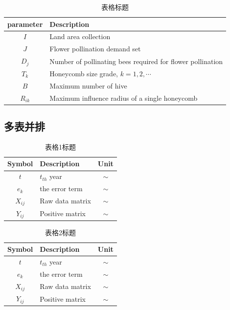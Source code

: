 \documentclass{resume/dhuBachelorclass}
\begin{document}
\begin{table}[H]
    \centering
    \caption{表格标题}
        \begin{tabular}{c||l}
        \toprule
        parameter  & Description \\
        \midrule
        $I$ & Land area collection \\
        $J$ & Flower pollination demand set \\
        $D_j$ & Number of pollinating bees required for flower pollination \\
        $T_k$ & Honeycomb size grade, $k = 1, 2, \cdots$ \\
        $B$ & Maximum number of hive \\
        $R_{ik}$ & Maximum influence radius of a single honeycomb \\
        \bottomrule
        \end{tabular}%
    \label{tab: 一个表}%
\end{table}%

\subsection{多表并排}

\begin{minipage}[c]{0.45\textwidth}
    \centering
    \begin{table}[H]
        \centering
        \caption{表格1标题}
            \begin{tabular}{c||lc}
            \toprule
            Symbol  & Description & Unit \\
            \midrule
            $t$ & $t_{th}$ year & $\sim$ \\
            $e_k$ & the error term & $\sim$ \\
            $X_{ij}$ & Raw data matrix & $\sim$ \\
            $Y_{ij}$ & Positive matrix & $\sim$ \\
            \bottomrule
            \end{tabular}%
        \label{tab: 表格1标题}%
    \end{table}%
\end{minipage}
\begin{minipage}[c]{0.45\textwidth}
    \centering
    \begin{table}[H]
        \centering
        \caption{表格2标题}
            \begin{tabular}{c||lc}
            \toprule
            Symbol  & Description & Unit \\
            \midrule
            $t$ & $t_{th}$ year & $\sim$ \\
            $e_k$ & the error term & $\sim$ \\
            $X_{ij}$ & Raw data matrix & $\sim$ \\
            $Y_{ij}$ & Positive matrix & $\sim$ \\
            \bottomrule
            \end{tabular}%
        \label{tab: 表格2标题}%
    \end{table}%
\end{minipage}
\end{document}
